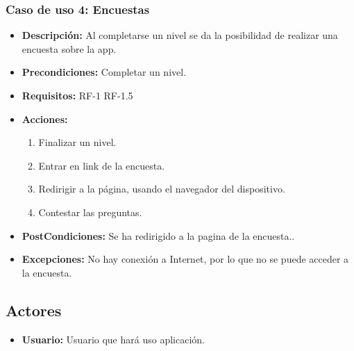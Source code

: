 \subsubsection{Caso de uso 4: Encuestas}
\begin{itemize}
	\item \textbf{Descripción:}  Al completarse un nivel se da la posibilidad de realizar una encuesta sobre la app.
	\item \textbf{Precondiciones:} Completar un nivel.
	\item \textbf{Requisitos:} RF-1 RF-1.5
	\item \textbf{Acciones:}
	\begin{enumerate}
		\item Finalizar un nivel.
		\item Entrar en link de la encuesta.
		\item Redirigir a la página, usando el navegador del dispositivo.
		\item Contestar las preguntas.
	\end{enumerate}
	\item \textbf{PostCondiciones:} Se ha redirigido a la pagina de la encuesta..
	\item \textbf{Excepciones:} No hay conexión a Internet, por lo que no se puede acceder a la encuesta.
	
\end{itemize}

\subsection{Actores}
\begin{itemize}
	\item \textbf{Usuario:} Usuario que hará uso aplicación.
\end{itemize}


